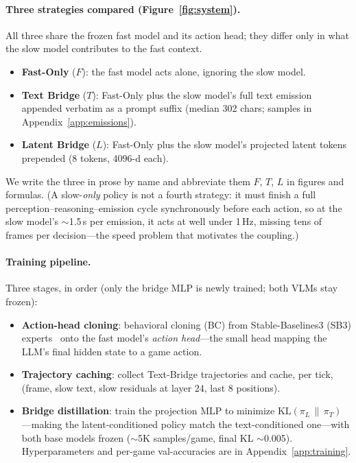 \documentclass[11pt]{article}
\begin{document}
\paragraph{Three strategies compared (Figure~\ref{fig:system}).}
All three share the frozen fast model and its action head; they differ only in
what the slow model contributes to the fast context.
\begin{itemize}[topsep=2pt,itemsep=2pt,leftmargin=*]
\item \textbf{Fast-Only} ($F$): the fast model acts alone, ignoring the slow model.
\item \textbf{Text Bridge} ($T$): Fast-Only plus the slow model's full text emission
appended verbatim as a prompt suffix (median 302 chars; samples in
Appendix~\ref{app:emissions}).
\item \textbf{Latent Bridge} ($L$): Fast-Only plus the slow model's projected latent
tokens prepended (8 tokens, 4096-d each).
\end{itemize}
We write the three in prose by name and abbreviate them $F$, $T$, $L$ in figures and
formulas. (A slow-\emph{only} policy is not a fourth strategy: it must finish a full
perception--reasoning--emission cycle synchronously before each action, so at the
slow model's $\sim$1.5\,s per emission, it acts at well under 1\,Hz, missing tens of
frames per decision---the speed problem that motivates the coupling.)

\paragraph{Training pipeline.}
Three stages, in order (only the bridge MLP is newly trained; both VLMs stay frozen):
\begin{itemize}[topsep=3pt,itemsep=2pt,leftmargin=*]
\item \textbf{Action-head cloning}: behavioral cloning (BC) from Stable-Baselines3 (SB3) experts~\cite{sb3zoo} onto the fast model's \emph{action head}---the small head mapping the LLM's final hidden state to a game action.
\item \textbf{Trajectory caching}: collect Text-Bridge trajectories and cache, per tick, (frame, slow text, slow residuals at layer 24, last 8 positions).
\item \textbf{Bridge distillation}: train the projection MLP to minimize $\mathrm{KL}(\pi_L\,\|\,\pi_T)$---making the latent-conditioned policy match the text-conditioned one---with both base models frozen ($\sim$5K samples/game, final KL $\sim$0.005). Hyperparameters and per-game val-accuracies are in Appendix~\ref{app:training}.
\end{itemize}
\end{document}

